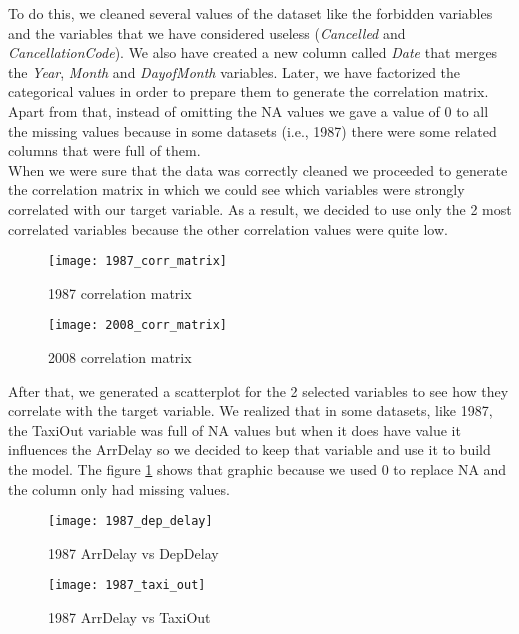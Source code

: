 To do this, we cleaned several values of the dataset like the forbidden variables and the variables that we have considered useless (\textit{Cancelled} and \textit{CancellationCode}). We also have created a new column called \textit{Date} that merges the \textit{Year}, \textit{Month} and \textit{DayofMonth} variables. Later, we have factorized the categorical values in order to prepare them to generate the correlation matrix. Apart from that, instead of omitting the NA values we gave a value of 0 to all the missing values because in some datasets (i.e., 1987) there were some related columns that were full of them.\\

When we were sure that the data was correctly cleaned we proceeded to generate the correlation matrix in which we could see which variables were strongly correlated with our target variable. As a result, we decided to use only the 2 most correlated variables because the other correlation values were quite low.\\

\begin{figure}[H]
	\centering
	\texttt{[image: 1987\_corr\_matrix]}
	\caption{1987 correlation matrix}
\end{figure}

\begin{figure}[H]
	\centering
	\texttt{[image: 2008\_corr\_matrix]}
	\caption{2008 correlation matrix}
\end{figure}

After that, we generated a scatterplot for the 2 selected variables to see how they correlate with the target variable. We realized that in some datasets, like 1987, the TaxiOut variable was full of NA values but when it does have value it influences the ArrDelay so we decided to keep that variable and use it to build the model. The figure \ref{fig:1987_taxi_out} shows that graphic because we used 0 to replace NA and the column only had missing values. \\

\begin{figure}[H]
	\centering
	\begin{minipage}{.45\textwidth}
		\centering
		\texttt{[image: 1987\_dep\_delay]}
		\caption{1987 ArrDelay vs DepDelay}
		\label{fig:1987_dep_delay}
	\end{minipage}\hfill
	\begin{minipage}{.45\textwidth}
		\centering
		\texttt{[image: 1987\_taxi\_out]}
		\caption{1987 ArrDelay vs TaxiOut}
		\label{fig:1987_taxi_out}
	\end{minipage}
\end{figure}

